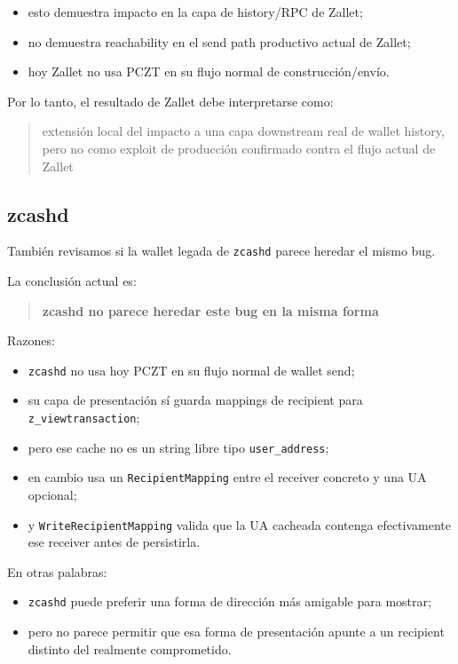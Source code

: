 \documentclass[11pt,a4paper]{article}
\begin{document}
\begin{itemize}[leftmargin=2em]
    \item esto demuestra impacto en la capa de history/RPC de Zallet;
    \item no demuestra reachability en el send path productivo actual de Zallet;
    \item hoy Zallet no usa PCZT en su flujo normal de construcción/envío.
\end{itemize}

Por lo tanto, el resultado de Zallet debe interpretarse como:

\begin{quote}
extensión local del impacto a una capa downstream real de wallet history,
pero no como exploit de producción confirmado contra el flujo actual de Zallet
\end{quote}

\subsection{zcashd}

También revisamos si la wallet legada de \texttt{zcashd} parece heredar el
mismo bug.

La conclusión actual es:

\begin{quote}
\textbf{zcashd no parece heredar este bug en la misma forma}
\end{quote}

Razones:

\begin{itemize}[leftmargin=2em]
    \item \texttt{zcashd} no usa hoy PCZT en su flujo normal de wallet send;
    \item su capa de presentación sí guarda mappings de recipient para
    \texttt{z\_viewtransaction};
    \item pero ese cache no es un string libre tipo \texttt{user\_address};
    \item en cambio usa un \texttt{RecipientMapping} entre el receiver concreto
    y una UA opcional;
    \item y \texttt{WriteRecipientMapping} valida que la UA cacheada contenga
    efectivamente ese receiver antes de persistirla.
\end{itemize}

En otras palabras:

\begin{itemize}[leftmargin=2em]
    \item \texttt{zcashd} puede preferir una forma de dirección más amigable
    para mostrar;
    \item pero no parece permitir que esa forma de presentación apunte a un
    recipient distinto del realmente comprometido.
\end{itemize}
\end{document}
